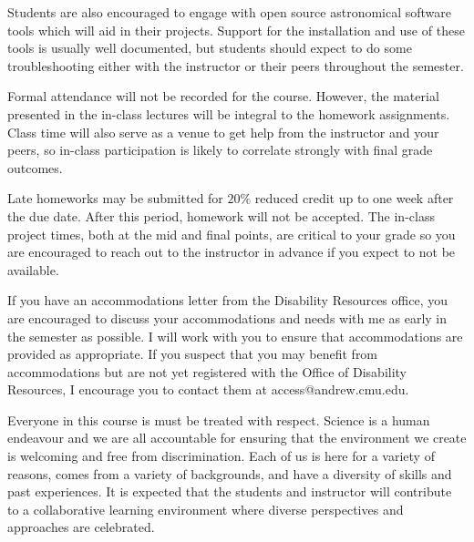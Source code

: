 \documentclass[11pt, a4paper]{article}
\begin{document}
Students are also encouraged to engage with open source astronomical software
tools which will aid in their projects. Support for the installation and use of
these tools is usually well documented, but students should expect to do some
troubleshooting either with the instructor or their peers throughout the
semester.


\vspace{.4cm}

\noindent 
Formal attendance will not be recorded for the course. However, the material
presented in the in-class lectures will be integral to the homework assignments.
Class time will also serve as a venue to get help from the instructor and your
peers, so in-class participation is likely to correlate strongly with final
grade outcomes. 

Late homeworks may be submitted for $20\%$ reduced credit up to one week after
the due date. After this period, homework will not be accepted. The in-class
project times, both at the mid and final points, are critical to your grade so
you are encouraged to reach out to the instructor in advance if you expect to
not be available. 

\vspace{.4cm}

\noindent
If you have an accommodations letter from the Disability Resources office, you
are encouraged to discuss your accommodations and needs with me as early in the
semester as possible. I will work with you to ensure that accommodations are
provided as appropriate. If you suspect that you may benefit from accommodations
but are not yet registered with the Office of Disability Resources, I encourage
you to contact them at access@andrew.cmu.edu.
\vspace{.4cm}


\noindent 
Everyone in this course is must be treated with respect. Science is a human
endeavour and we are all accountable for ensuring that the environment we create
is welcoming and free from discrimination. Each of us is here for a variety of
reasons, comes from a variety of backgrounds, and have a diversity of skills and
past experiences. It is expected that the students and instructor will
contribute to a collaborative learning environment where diverse perspectives
and approaches are celebrated.
\end{document}
